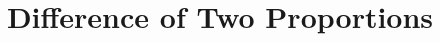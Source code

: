 \documentclass{beamer}
\title[MA205 - Section 6.2]{Difference of Two Proportions}
\begin{document}
\begin{frame}
  \titlepage
\end{frame}
\end{document}

